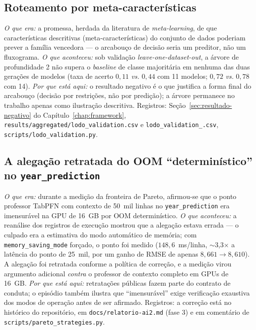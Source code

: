 \subsection{Roteamento por meta-características}
\emph{O que era:} a promessa, herdada da literatura de
\emph{meta-learning}, de que características descritivas
(meta-características) do conjunto de dados poderiam
prever a família vencedora --- o arcabouço de decisão seria um
preditor, não um fluxograma. \emph{O que aconteceu:} sob validação
\emph{leave-one-dataset-out}, a árvore de profundidade 2 não supera o
\emph{baseline} de classe majoritária em nenhuma das duas gerações de
modelos (taxa de acerto $0{,}11$ \emph{vs.} $0{,}44$ com 11 modelos;
$0{,}72$ \emph{vs.} $0{,}78$ com 14). \emph{Por que está aqui:} o
resultado negativo é o que justifica a forma final do arcabouço
(decisão por restrições, não por predição); a árvore permanece no
trabalho apenas como ilustração descritiva. Registros:
Seção~\ref{sec:resultado-negativo} do
Capítulo~\ref{chap:framework},
\texttt{results/\allowbreak aggregated/\allowbreak lodo\_\allowbreak validation.\allowbreak csv} e
\texttt{lodo\_\allowbreak validation\_.\allowbreak csv}, \texttt{scripts/\allowbreak lodo\_\allowbreak validation.\allowbreak py}.

\subsection[Alegação retratada do OOM no year\_prediction]{A alegação retratada do OOM ``determinístico'' no
\texttt{year\_\allowbreak prediction}}
\emph{O que era:} durante a medição da fronteira de Pareto,
afirmou-se que o ponto professor TabPFN com contexto de 50~mil linhas no
\texttt{year\_\allowbreak prediction} era imensurável na GPU de 16~GB por OOM
determinístico. \emph{O que aconteceu:} a reanálise dos registros de
execução mostrou que a alegação estava errada --- o culpado era a estimativa do
modo automático de memória; com \texttt{memory\_\allowbreak saving\_\allowbreak mode} forçado,
o ponto foi medido ($148{,}6$~ms/linha, $\sim$3,3$\times$ a latência
do ponto de 25~mil, por um ganho de RMSE de apenas
$8{,}661 \to 8{,}610$). A alegação foi retratada conforme a política de
correção, e a medição virou argumento adicional \emph{contra} o
professor de contexto completo em GPUs de 16~GB. \emph{Por que está
aqui:} retratações públicas fazem parte do contrato de conduta; o
episódio também ilustra que ``imensurável'' exige verificação
exaustiva dos modos de operação antes de ser afirmado. Registros: a
correção está no histórico do repositório,
em \texttt{docs/\allowbreak relatorio-\allowbreak ai2.\allowbreak md}
(fase 3) e em comentário de
\texttt{scripts/\allowbreak pareto\_\allowbreak strategies.\allowbreak py}.

